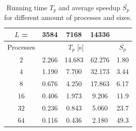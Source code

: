 \begin{table}[H]
\begin{center}
\begin{tabular}{c|c|c|c|c|}
$L$ =  & 3584 & 7168 & 14336 &  \\
\hline
Processes & \multicolumn{3}{c|}{$T_p$ [s]} & {$\bar{S_p}$} \\
\hline
$2$ & 2.266 & 14.683 & 62.276 & 1.80\\
$4$ & 1.190 & 7.700  & 32.173 & 3.44\\
$8$ & 0.676 & 4.250  & 17.863 & 6.17\\
$16$ & 0.406 & 1.973 & 9.206 & 11.9\\
$32$ & 0.236 & 0.843 & 5.060 & 23.7\\
$64$ & 0.116 & 0.436 & 2.180 & 49.3\\

\hline
\end{tabular}
\caption{\label{table:speedup_fft} Running time $T_p$ and average speedup $\bar{S_p}$ for different amount of processes and sizes.}
\end{center}
\end{table}

